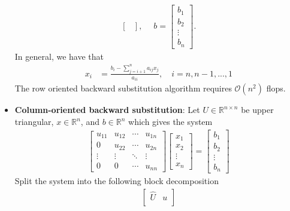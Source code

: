\documentclass{report}
\begin{document}
\begin{itemize}
\begin{align*}
\begin{bmatrix}
                \end{bmatrix}, \quad \;
                b = \begin{bmatrix}
                    b_{1} \\ b_{2} \\ \vdots \\ b_{n}
                \end{bmatrix}
            .\end{align*}
            In general, we have that
            \begin{align*}
                x_{i} &= \frac{b_{i} - \sum_{j=i+1}^{n}a_{ij}x_{j}}{a_{ii}}, \quad i=n,n-1,...,1
            \end{align*}
            The row oriented backward substitution algorithm requires $\mathcal{O}(n^{2})$ flops.
        \item \textbf{Column-oriented backward substitution}:
            Let $U \in \mathbb{R}^{n\times n}$ be upper triangular, $x \in \mathbb{R}^{n}$, and $ b \in \mathbb{R}^{n}$ which gives the system
            \begin{align*}
                \begin{bmatrix}
                    u_{11} & u_{12} & \cdots & u_{1n} \\
                    0 & u_{22} & \cdots & u_{2n} \\
                    \vdots & \vdots & \ddots & \vdots \\
                    0 & 0 & \cdots & u_{nn}
                \end{bmatrix} 
                \begin{bmatrix}
                    x_{1} \\ x_{2} \\ \vdots \\ x_{n}
                \end{bmatrix}
                = 
                \begin{bmatrix}
                    b_{1} \\ b_{2} \\ \vdots \\ b_{n}
                \end{bmatrix}
            \end{align*}
            Split the system into the following block decomposition
            \begin{align*}
                \begin{bmatrix}
                    \hat{U} & u \\

\end{bmatrix}
\end{align*}
\end{itemize}
\end{document}
